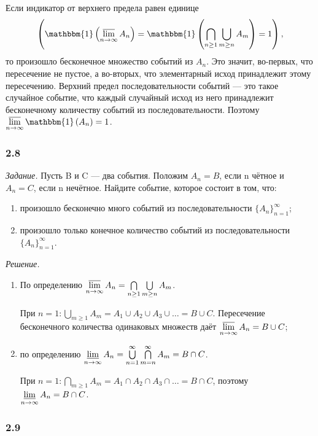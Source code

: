 Если индикатор от верхнего предела равен единице
$$ \left( \mathbbm{ 1 } \left( \varlimsup \limits_{ n \to \infty } A_n \right) =
\mathbbm{ 1 } \left( \bigcap \limits_{ n \geq 1} \bigcup \limits_{ m \geq n } A_m \right) =
1 \right) ,$$
то произошло бесконечное множество событий из $A_n$.
Это значит, во-первых, что пересечение не пустое, а во-вторых, что элементарный исход принадлежит этому пересечению.
Верхний предел последовательности событий --- это такое случайное событие,
что каждый случайный исход из него принадлежит бесконечному количеству событий из последовательности.
Поэтому
$ \varlimsup \limits_{ n \to \infty } \mathbbm{ 1 } \left( A_n \right) = 1 $.

\subsubsection*{2.8}

\textit{Задание.} Пусть B и C --- два события.
Положим $ A_n = B $, если n чётное и $ A_n = C $, если n нечётное.
Найдите событие, которое состоит в том, что:
\begin{enumerate}[label=\alph*)]
\item произошло бесконечно много событий из последовательности $ \{ A_n \}_{ n = 1 }^\infty $;
\item произошло только конечное количество событий из последовательности $ \{ A_n \}_{ n = 1 }^\infty $.
\end{enumerate}

\textit{Решение.}
\begin{enumerate}[label=\alph*)]
\item По определению $ \varlimsup \limits_{ n \to \infty } A_n = \bigcap \limits_{ n \geq 1} \bigcup \limits_{ m \geq n} A_m $.

При $ n = 1: \bigcup \limits_{ m \geq 1} A_m = A_1 \cup A_2 \cup A_3 \cup \dotsc = B \cup C $.
Пересечение бесконечного количества одинаковых множеств даёт $ \varlimsup \limits_{ n \to \infty } A_n = B \cup C $;

\item по определению $ \varliminf \limits_{ n \to \infty } A_n = \bigcup \limits_{ n = 1 }^\infty \bigcap \limits_{ m = n }^\infty A_m = B \cap C $.

При $ n = 1 : \bigcap \limits_{ m \geq 1 } A_m = A_1 \cap A_2 \cap A_3 \cap \dotsc = B \cap C $, поэтому $ \varliminf \limits_{ n \to \infty } A_n = B \cap C $.
\end{enumerate}

\subsubsection*{2.9}

